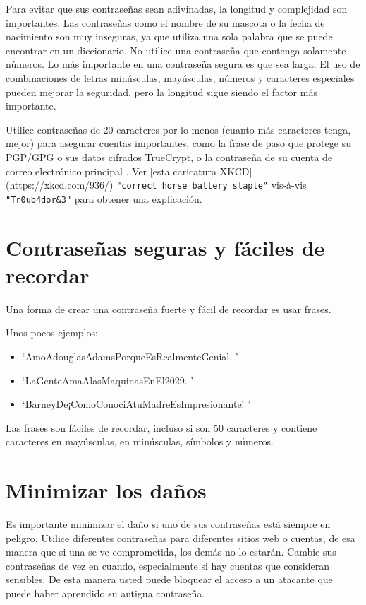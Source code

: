 \documentclass[10pt,a5paper,twoside,,]{book}
\providecommand{\tightlist}{%
  \setlength{\itemsep}{0pt}\setlength{\parskip}{0pt}}
\begin{document}
Para evitar que sus contraseñas sean adivinadas, la longitud y
complejidad son importantes. Las contraseñas como el nombre de su
mascota o la fecha de nacimiento son muy inseguras, ya que utiliza una
sola palabra que se puede encontrar en un diccionario. No utilice una
contraseña que contenga solamente números. Lo más importante en una
contraseña segura es que sea larga. El uso de combinaciones de letras
minúsculas, mayúsculas, números y caracteres especiales pueden mejorar
la seguridad, pero la longitud sigue siendo el factor más importante.

Utilice contraseñas de 20 caracteres por lo menos (cuanto más caracteres
tenga, mejor) para asegurar cuentas importantes, como la frase de paso
que protege su PGP/GPG o sus datos cifrados TrueCrypt, o la contraseña
de su cuenta de correo electrónico principal . Ver {[}esta caricatura
XKCD{]} (https://xkcd.com/936/)
\texttt{"correct\ horse\ battery\ staple"} vis-à-vis
\texttt{"Tr0ub4dor\&3"} para obtener una explicación.

\section{Contraseñas seguras y fáciles de
recordar}\label{contraseuxf1as-seguras-y-fuxe1ciles-de-recordar}

Una forma de crear una contraseña fuerte y fácil de recordar es usar
frases.

Unos pocos ejemplos:

\begin{itemize}
\tightlist
\item
  `AmoAdouglasAdamsPorqueEsRealmenteGenial. '
\item
  `LaGenteAmaAlasMaquinasEnEl2029. '
\item
  `BarneyDe¡ComoConociAtuMadreEsImpresionante! '
\end{itemize}

Las frases son fáciles de recordar, incluso si son 50 caracteres y
contiene caracteres en mayúsculas, en minúsculas, símbolos y números.

\section{Minimizar los daños}\label{minimizar-los-dauxf1os}

Es importante minimizar el daño si uno de sus contraseñas está siempre
en peligro. Utilice diferentes contraseñas para diferentes sitios web o
cuentas, de esa manera que si una se ve comprometida, los demás no lo
estarán. Cambie sus contraseñas de vez en cuando, especialmente si hay
cuentas que consideran sensibles. De esta manera usted puede bloquear el
acceso a un atacante que puede haber aprendido su antigua contraseña.
\end{document}
